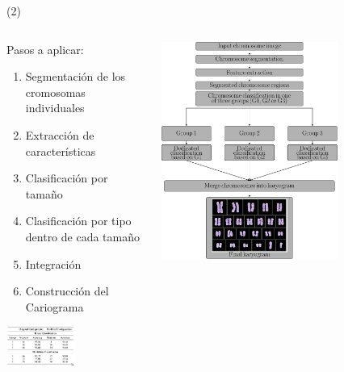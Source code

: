\begin{frame}{ \footnotemark (2)}
\begin{columns}
\begin{column}{0.6\textwidth}
Pasos a aplicar:
		\begin{enumerate}
		\item Segmentación de los cromosomas individuales 
		\item Extracción de características
		\item Clasificación por tamaño
		\item Clasificación por tipo dentro de cada tamaño
		\item Integración
		\item Construcción del Cariograma
		\end{enumerate}
    \begin{center}
     \includegraphics[width=0.5\textwidth]{Figs/Karyogram4}
     \end{center}


\end{column}
\begin{column}{0.4\textwidth}  
    \begin{center}
     \includegraphics[width=0.7\textwidth]{Figs/Karyogram5}
     \end{center}
\end{column}
\end{columns}
\end{frame}






